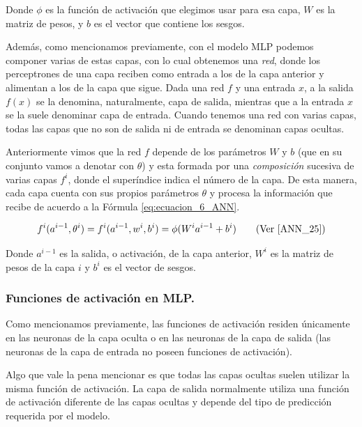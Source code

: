 \documentclass[12pt,a4paper]{article}
\begin{document}
\begin{sloppypar}
Donde $\phi$ es la función de activación que elegimos usar para esa capa, $W$ es la matriz de pesos, y $b$ es el vector que contiene los sesgos.

Además, como mencionamos previamente, con el modelo MLP podemos componer varias de estas capas, con lo cual obtenemos una \textit{red}, donde los perceptrones de una capa reciben como entrada a los de la capa anterior y alimentan a los de la capa que sigue. Dada una red $f$ y una entrada $x$, a la salida $f(x)$ se la denomina, naturalmente, capa de salida, mientras que a la entrada $x$ se la suele denominar capa de entrada. Cuando tenemos una red con varias capas, todas las capas que no son de salida ni de entrada se denominan capas ocultas. 

Anteriormente vimos que la red $f$ depende de los parámetros $W$ y $b$ (que en su conjunto vamos a denotar con $\theta$) y esta formada por una \textit{composición} sucesiva de varias capas $f^i$, donde el superíndice indica el número de la capa. De esta manera, cada capa cuenta con sus propios parámetros $\theta$ y procesa la información que recibe de acuerdo a la Fórmula \ref{eq:ecuacion_6_ANN}.

\begin{equation}\label{eq:ecuacion_6_ANN}
f^i(a^{i-1},\theta^i) = f^i(a^{i-1},w^i,b^i) = \phi(W^{i}a^{i-1}+b^i)    \qquad  \text{(Ver \cite{ANN_25})}
\end{equation}

Donde $a^{i-1}$ es la salida, o activación, de la capa anterior, $W^i$ es la matriz de pesos de la capa $i$ y $b^i$ es el vector de sesgos.

\subsubsection{Funciones de activación en MLP.}\label{Func_activ}

Como mencionamos previamente, las funciones de activación residen únicamente en las neuronas de la capa oculta o en las neuronas de la capa de salida (las neuronas de la capa de entrada no poseen funciones de activación).

Algo que vale la pena mencionar es que todas las capas ocultas suelen utilizar la misma función de activación. La capa de salida normalmente utiliza una función de activación diferente de las capas ocultas y depende del tipo de predicción requerida por el modelo.


\end{sloppypar}
\end{document}
